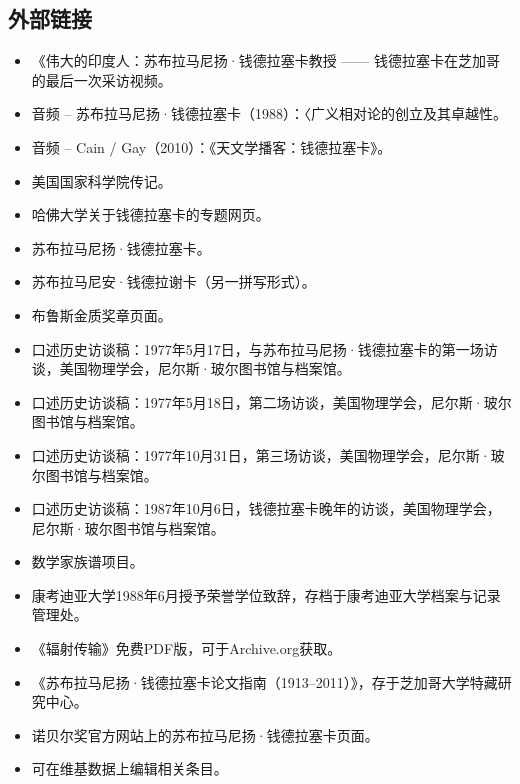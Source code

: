 \subsection{外部链接}
\begin{itemize}
\item 《伟大的印度人：苏布拉马尼扬·钱德拉塞卡教授 —— 钱德拉塞卡在芝加哥的最后一次采访视频。
\item 音频 – 苏布拉马尼扬·钱德拉塞卡（1988）：〈广义相对论的创立及其卓越性。
\item 音频 – Cain / Gay（2010）：《天文学播客：钱德拉塞卡》。
\item 美国国家科学院传记。
\item 哈佛大学关于钱德拉塞卡的专题网页。
\item 苏布拉马尼扬·钱德拉塞卡。
\item 苏布拉马尼安·钱德拉谢卡（另一拼写形式）。
\item 布鲁斯金质奖章页面。
\item 口述历史访谈稿：1977年5月17日，与苏布拉马尼扬·钱德拉塞卡的第一场访谈，美国物理学会，尼尔斯·玻尔图书馆与档案馆。
\item 口述历史访谈稿：1977年5月18日，第二场访谈，美国物理学会，尼尔斯·玻尔图书馆与档案馆。
\item 口述历史访谈稿：1977年10月31日，第三场访谈，美国物理学会，尼尔斯·玻尔图书馆与档案馆。
\item 口述历史访谈稿：1987年10月6日，钱德拉塞卡晚年的访谈，美国物理学会，尼尔斯·玻尔图书馆与档案馆。
\item 数学家族谱项目。
\item 康考迪亚大学1988年6月授予荣誉学位致辞，存档于康考迪亚大学档案与记录管理处。
\item 《辐射传输》免费PDF版，可于Archive.org获取。
\item 《苏布拉马尼扬·钱德拉塞卡论文指南（1913–2011）》，存于芝加哥大学特藏研究中心。
\item 诺贝尔奖官方网站上的苏布拉马尼扬·钱德拉塞卡页面。
\item 可在维基数据上编辑相关条目。
\end{itemize}
